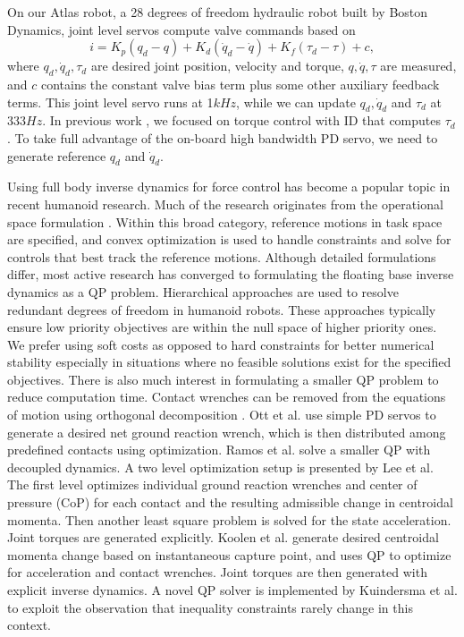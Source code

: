 \documentclass{ws-ijhr}
\begin{document}
On our Atlas robot, a 28 degrees of freedom hydraulic robot built by Boston 
Dynamics, joint level servos compute valve commands based on 
\begin{equation}
  i = K_p(q_d-q) + K_d(\dot{q}_d-\dot{q}) + K_f(\tau_d-\tau) + c,
  \label{eq:servo}
\end{equation}
where $q_d, \dot{q}_d, \tau_d$ are desired joint position, velocity and torque,
$q, \dot{q}, \tau$ are measured, and 
$c$ contains the constant valve bias term plus some other auxiliary feedback 
terms. This joint level servo runs at 1$kHz$, while we can update 
$q_d,\dot{q}_d$ and $\tau_d$ at 333$Hz$. 
In previous work \cite{stephens_thesis,whitman_thesis,sfeng_online}, 
we focused on torque control with ID that computes $\tau_d$. 
To take full advantage of the on-board high bandwidth PD servo, we need to 
generate reference $q_d$ and $\dot{q}_d$. 

Using full body inverse dynamics for force control has become a popular topic
in recent humanoid research. Much of the research originates from the 
operational space formulation \cite{khatib_op_space_ctrl}. 
Within this broad category, reference motions in task space are specified, 
and convex optimization is used to handle constraints and solve for controls
that best track the reference motions. 
Although detailed formulations differ, most active research has converged to 
formulating the floating base inverse dynamics as a QP problem. 
Hierarchical approaches \cite{eth_id,Hutter01052014,alex_hir,saab_fast_hir_qp,deLasa_hir,wensing_hir,sentis_wbc}
are used to resolve redundant degrees of freedom in humanoid robots. 
These approaches typically ensure low priority objectives are within the null
space of higher priority ones. 
We prefer using soft costs as opposed to hard constraints for better numerical 
stability especially in situations where no feasible solutions exist for the 
specified objectives.
There is also much interest in formulating a smaller QP problem to reduce 
computation time. Contact wrenches can be removed from the
equations of motion using orthogonal decomposition \cite{usc_id1}.
Ott et al. \cite{ott_force_alloc} use simple PD servos to generate a 
desired net ground reaction wrench, which is then distributed among predefined 
contacts using optimization.
Ramos et al. \cite{ramos_dyn_walking} solve a smaller QP with decoupled dynamics. 
A two level optimization setup is presented by Lee et al. \cite{lee_separate_grf} 
The first level optimizes individual ground reaction wrenches and center of pressure
(CoP) for each contact and the resulting admissible change in centroidal momenta. 
Then another least square problem is solved for the state acceleration. 
Joint torques are generated explicitly. 
Koolen et al. \cite{ihmc_vrc} generate desired centroidal momenta change based 
on instantaneous capture point, and uses QP to optimize for acceleration and 
contact wrenches. Joint torques are then generated with explicit inverse dynamics. 
A novel QP solver is implemented by Kuindersma et al. \cite{scott_qp} to exploit
the observation that inequality constraints rarely change in this context.
\end{document}

